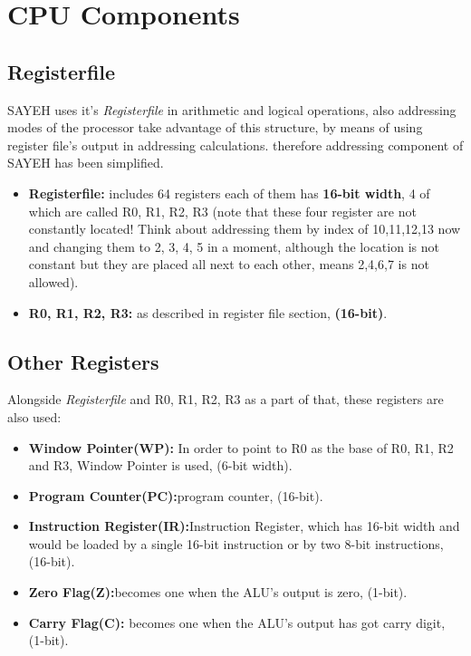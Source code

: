 \documentclass{report}
\begin{document}
\section{CPU Components}
\subsection{Registerfile}
\par
SAYEH uses it’s \textit{Registerfile} in arithmetic and logical
operations, also addressing modes of the processor take
advantage of this structure, by means of using register file’s
output in addressing calculations. therefore addressing
component of SAYEH has been simplified.

\begin{itemize}
	\item \textbf{Registerfile:} includes 64 registers each of them has  \textbf{16-bit width},
		4 of which are called R0, R1, R2, R3 (note that these four register are not constantly located!
		Think about addressing them by index of 10,11,12,13 now and changing them to 2, 3, 4, 5 in a moment,
		although the location is not constant but they are placed all next to each other, means 2,4,6,7 is not allowed).
	\item \textbf{R0, R1, R2, R3:} as described in register file section, \textbf{(16-bit)}.
\end{itemize}


\subsection{Other Registers}
\par
Alongside \textit{Registerfile} and R0, R1, R2, R3 as a part of that, these registers are also used:

\begin{itemize}
	\item \textbf{Window Pointer(WP):} In order to point to R0 as the base of R0, R1, R2 and R3, Window Pointer is used, (6-bit width).
        \item \textbf{Program Counter(PC):}program counter, (16-bit).
        \item \textbf{Instruction Register(IR):}Instruction Register, which has 16-bit width and would be loaded by a single 16-bit
		instruction or by two 8-bit instructions, (16-bit).
        \item \textbf{Zero Flag(Z):}becomes one when the ALU’s output is zero, (1-bit).
        \item \textbf{Carry Flag(C):} becomes one when the ALU’s output has got carry digit, (1-bit).
\end{itemize}
\end{document}
